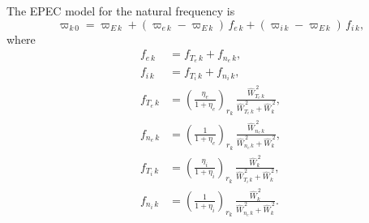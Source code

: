 \documentclass[notitlepage,12pt]{article}
\begin{document}
The EPEC model for the natural frequency is
\begin{equation}\label{ecomp}
\varpi_{k\,0} = \varpi_{E\,k} + (\varpi_{e\,k} - \varpi_{E\,k})\,f_{e\,k} + (\varpi_{i\,k} - \varpi_{E\,k})\,f_{i\,k},
\end{equation}
where
\begin{align}
f_{e\,k}&= f_{T_e\,k}+ f_{n_e\,k},\\[0.5ex]
f_{i\,k}&= f_{T_i\,k}+ f_{n_i\,k},\\[0.5ex]
f_{T_e\,k}&=\left(\frac{\eta_e}{1+\eta_e}\right)_{r_k}\,\frac{\hat{W}_{T_e\,k}^{\,2}}{\hat{W}_{T_e\,k}^{\,2}+\hat{W}_k^{\,2}},\\[0.5ex]
f_{n_e\,k}&=\left(\frac{1}{1+\eta_e}\right)_{r_k}\,\frac{\hat{W}_{n_e\,k}^{\,2}}{\hat{W}_{n_e\,k}^{\,2}+\hat{W}_k^{\,2}},\\[0.5ex]
f_{T_i\,k}&=\left(\frac{\eta_i}{1+\eta_i}\right)_{r_k}\,\frac{\hat{W}_k^{\,2}}{\hat{W}_{T_i\,k}^{\,2}+\hat{W}_k^{\,2}},\\[0.5ex]
f_{n_i\,k}&=\left(\frac{1}{1+\eta_i}\right)_{r_k}\,\frac{\hat{W}_k^{\,2}}{\hat{W}_{n_e\,k}^{\,2}+\hat{W}_k^{\,2}}.
\end{align}
\end{document}
